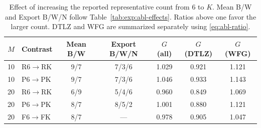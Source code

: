 \begin{table}[t]
\centering
\caption{Effect of increasing the reported representative count from 6 to $K$. Mean B/W and Export B/W/N follow Table~\ref{tab:exp:abl-effects}. Ratios above one favor the larger count. DTLZ and WFG are summarized separately using \eqref{eq:abl-ratio}.}
\label{tab:exp:k-effects}
\small
\begin{tabular}{clccccc}
\toprule
$M$ & Contrast & Mean B/W & Export B/W/N & $G$ (all) & $G$ (DTLZ) & $G$ (WFG) \\
\midrule
10 & R6$\to$RK & 9/7 & 7/3/6 & 1.029 & 0.921 & 1.121 \\
10 & P6$\to$PK & 9/7 & 7/3/6 & 1.046 & 0.933 & 1.143 \\
20 & R6$\to$RK & 6/9 & 5/4/6 & 0.960 & 0.849 & 1.069 \\
20 & P6$\to$PK & 8/7 & 8/5/2 & 1.001 & 0.880 & 1.121 \\
20 & F6$\to$FK & 8/7 & --- & 0.978 & 0.905 & 1.047 \\
\bottomrule
\end{tabular}
\end{table}
